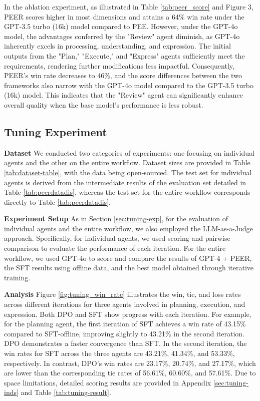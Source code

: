 \documentclass[11pt]{article}
\begin{document}
In the ablation experiment, as illustrated in Table \ref{tab:peer_score} and Figure 3, PEER scores higher in most dimensions and attains a 64\% win rate under the GPT-3.5 turbo (16k) model compared to PEE. However, under the GPT-4o model, the advantages conferred by the "Review" agent diminish, as GPT-4o inherently excels in processing, understanding, and expression. The initial outputs from the "Plan," "Execute," and "Express" agents sufficiently meet the requirements, rendering further modifications less impactful. Consequently, PEER’s win rate decreases to 46\%, and the score differences between the two frameworks also narrow with the GPT-4o model compared to the GPT-3.5 turbo (16k) model. This indicates that the "Review" agent can significantly enhance overall quality when the base model’s performance is less robust.

\subsection{Tuning Experiment}
\textbf{Dataset } We conducted two categories of experiments: one focusing on individual agents and the other on the entire workflow. Dataset sizes are provided in Table \ref{tab:dataset-table}, with the data being open-sourced. The test set for individual agents is derived from the intermediate results of the evaluation set detailed in Table \ref{tab:peerdatadis}, whereas the test set for the entire workflow corresponds directly to Table \ref{tab:peerdatadis}.


\textbf{Experiment Setup} As in Section \ref{sec:tuning-exp}, for the evaluation of individual agents and the entire workflow, we also employed the LLM-as-a-Judge approach. Specifically, for individual agents, we used scoring and pairwise comparison to evaluate the performance of each iteration. For the entire workflow, we used GPT-4o to score and compare the results of GPT-4 + PEER, the SFT results using offline data, and the best model obtained through iterative training.

\textbf{Analysis} Figure \ref{fig:tuning_win_rate} illustrates the win, tie, and loss rates across different iterations for three agents involved in planning, execution, and expression. Both DPO and SFT show progress with each iteration. For example, for the planning agent, the first iteration of SFT achieves a win rate of 43.15\% compared to SFT-offline, improving slightly to 43.21\% in the second iteration. DPO demonstrates a faster convergence than SFT. In the second iteration, the win rates for SFT across the three agents are 43.21\%, 41.34\%, and 53.33\%, respectively. In contrast, DPO's win rates are 23.17\%, 20.74\%, and 27.17\%, which are lower than the corresponding tie rates of 56.61\%, 60.60\%, and 57.61\%. Due to space limitations, detailed scoring results are provided in Appendix \ref{sec:tuning-inds} and Table \ref{tab:tuning-result}.
\end{document}
